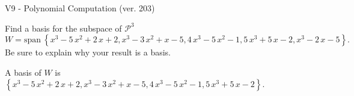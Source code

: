 \begin{exercise}
  \begin{exerciseTitle}V9 - Polynomial Computation (ver. 203)\end{exerciseTitle}
  \begin{exerciseStatement}
    Find a basis for the subspace of \(\mathcal{P}^3\) 
\[W=\mathrm{span}\ \left\{x^{3} - 5 \, x^{2} + 2 \, x + 2 , x^{3} - 3 \, x^{2} + x - 5 , 4 \, x^{3} - 5 \, x^{2} - 1 , 5 \, x^{3} + 5 \, x - 2 , x^{3} - 2 \, x - 5\right\}.\]
 Be sure to explain why your result is a basis.


  \end{exerciseStatement}
  \begin{exerciseAnswer}
   A basis of \(W\) is  \(\left\{x^{3} - 5 \, x^{2} + 2 \, x + 2 , x^{3} - 3 \, x^{2} + x - 5 , 4 \, x^{3} - 5 \, x^{2} - 1 , 5 \, x^{3} + 5 \, x - 2\right\}\).
  


  \end{exerciseAnswer}
\end{exercise}